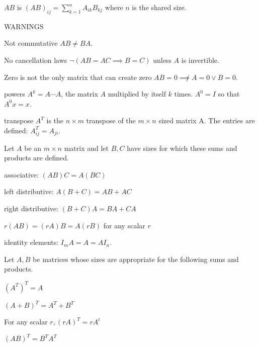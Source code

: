 \begin{card}
\begin{compactdesc}
        $AB$ is $(AB)_{ij} = \sum^n_{k=1} A_{ik}B_{kj}$ where $n$ is the
        shared size.
    \item[WARNINGS]
    \item[Not commutative] $AB \neq BA$.
    \item[No cancellation] laws $\lnot(AB = AC \implies B = C)$ unless $A$ is
        invertible.
    \item[Zero is not the only] matrix that can create zero
        $AB = 0 \not\implies A = 0 \lor B = 0$.
    \item[powers] $A^k = A \cdots A$, the matrix $A$ multiplied by itself
        $k$ times. $A^0 = I$ so that $A^0x = x$.
    \item[transpose] $A^T$ is the $n \times m$ transpose of the $m \times n$
        sized matrix A. The entries are defined: $A^T_{ij} = A_{ji}$.
    \end{compactdesc}
\end{card}
\begin{card}
    \begin{theorem}
        Let $A$ be an $m \times n$ matrix and let $B, C$ have sizes for which
        these sums and products are defined.
        \begin{compactenum}
        \item associative: $(AB)C = A(BC)$
        \item left distributive: $A(B + C) = AB + AC$
        \item right distributive: $(B + C)A = BA + CA$
        \item $r(AB) = (rA)B = A(rB)$ for any scalar $r$
        \item identity elements: $I_mA = A = AI_n$.
        \end{compactenum}
    \end{theorem}
    \begin{theorem}
        Let $A, B$ be matrices whose sizes are appropriate for the following
        sums and products.
        \begin{compactenum}
        \item $(A^T)^T = A$
        \item $(A + B)^T = A^T + B^T$
        \item For any scalar $r, (rA)^T = rA^t$
        \item $(AB)^T = B^TA^T$
        \end{compactenum}
    \end{theorem}

\end{card}


